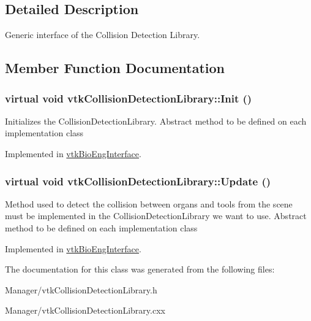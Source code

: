 \subsection{Detailed Description}
Generic interface of the Collision Detection Library. 

\subsection{Member Function Documentation}
\hypertarget{classvtkCollisionDetectionLibrary_ac29256d189958f001608f8f5d170a73c}{
\subsubsection[{Init}]{\setlength{\rightskip}{0pt plus 5cm}virtual void vtkCollisionDetectionLibrary::Init ()}}
\label{classvtkCollisionDetectionLibrary_ac29256d189958f001608f8f5d170a73c}


Initializes the CollisionDetectionLibrary. Abstract method to be defined on each implementation class 

Implemented in \hyperlink{classvtkBioEngInterface_a52f71a20ab8e16bbeb357642975a5b67}{vtkBioEngInterface}.\hypertarget{classvtkCollisionDetectionLibrary_ae3ce4d5055eee783a8bf9f06f62f5667}{
\subsubsection[{Update}]{\setlength{\rightskip}{0pt plus 5cm}virtual void vtkCollisionDetectionLibrary::Update ()}}
\label{classvtkCollisionDetectionLibrary_ae3ce4d5055eee783a8bf9f06f62f5667}


Method used to detect the collision between organs and tools from the scene must be implemented in the CollisionDetectionLibrary we want to use. Abstract method to be defined on each implementation class 

Implemented in \hyperlink{classvtkBioEngInterface_af04a067b7a6f524faa7ff14552147260}{vtkBioEngInterface}.

The documentation for this class was generated from the following files:\begin{DoxyCompactItemize}
\item 
Manager/vtkCollisionDetectionLibrary.h\item 
Manager/vtkCollisionDetectionLibrary.cxx\end{DoxyCompactItemize}
